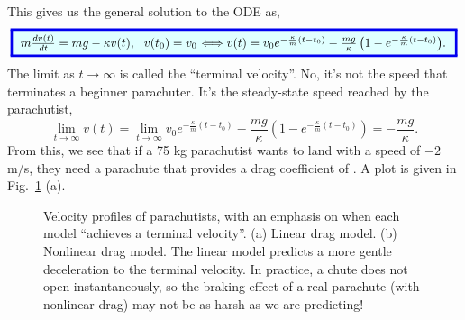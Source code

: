 This gives us the general solution to the ODE as,
\begin{equation}
    \label{eq:ODEHorizontalLinearDragGeneralSolution}
    \setlength{\fboxrule}{2pt} %
    \fcolorbox{brightblue}{lightblue}{%
    \addtolength{\fboxsep}{5pt} %
    \( m \frac{dv(t)}{dt} =  mg - \kappa v(t),~~  v(t_0)=v_0  \) \(\Longleftrightarrow v(t) =  v_0 e^{-\frac{\kappa}{m}(t - t_0)} - \frac{mg}{\kappa} \left( 1 - e^{-\frac{\kappa}{m}(t - t_0)} \right)\).
    }
\end{equation}
The limit as $t \to \infty$ is called the ``terminal velocity''. No, it's not the speed that terminates a beginner parachuter. It's the steady-state speed reached by the parachutist,
$$ \lim_{t \to \infty} v(t) =  \lim_{t \to \infty} v_0 e^{-\frac{\kappa}{m}(t - t_0)} - \frac{mg}{\kappa} \left( 1 - e^{-\frac{\kappa}{m}(t - t_0)} \right) = -\frac{m g}{\kappa}.$$
From this, we see that if a 75 kg parachutist wants to land with a speed of $-2$m/s, they need a parachute that provides a drag coefficient of . A plot is given in Fig.~\ref{fig:Parachutist}-(a).

\Qed

\bigskip

\begin{figure}[htb]%
\centering
{}%
\hfill
{}%
\hfill
    \caption[]{Velocity profiles of parachutists, with an emphasis on when each model ``achieves a terminal velocity''. (a) Linear drag model. (b) Nonlinear drag model. The linear model predicts a more gentle deceleration to the terminal velocity. In practice, a chute does not open instantaneously, so the braking effect of a real parachute (with nonlinear drag) may not be as harsh as we are predicting!}
    \label{fig:Parachutist}
\end{figure}

